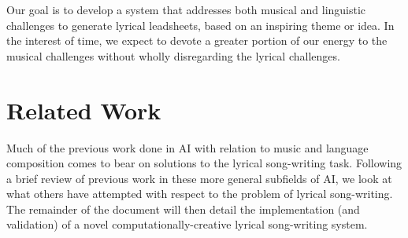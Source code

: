 \documentclass[11pt,phd]{byuprop}
\begin{document}
Our goal is to develop a system that addresses both musical and linguistic challenges to generate lyrical leadsheets, based on an inspiring theme or idea. In the interest of time, we expect to devote a greater portion of our energy to the musical challenges without wholly disregarding the lyrical challenges.


\section{Related Work}

Much of the previous work done in AI with relation to music and language composition comes to bear on solutions to the lyrical song-writing task. Following a brief review of previous work in these more general subfields of AI, we look at what others have attempted with respect to the problem of lyrical song-writing. The remainder of the document will then detail the implementation (and validation) of a novel computationally-creative lyrical song-writing system.

\end{document}
